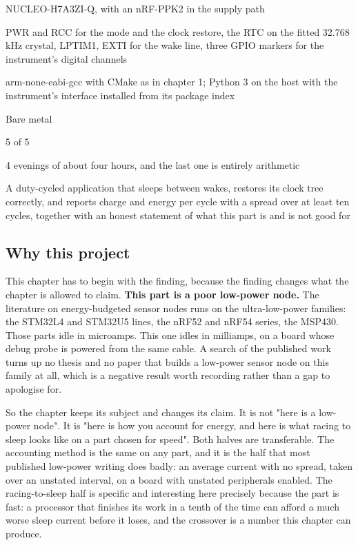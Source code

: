 
\begin{keyfacts}
\item[Board] NUCLEO-H7A3ZI-Q, with an nRF-PPK2 in the supply path
\item[Peripherals] PWR and RCC for the mode and the clock restore, the RTC on the fitted 32.768 kHz crystal, LPTIM1, EXTI for the wake line, three GPIO markers for the instrument's digital channels
\item[Toolchain] arm-none-eabi-gcc with CMake as in chapter 1; Python 3 on the host with the instrument's interface installed from its package index
\item[Operating system] Bare metal
\item[Difficulty] 5 of 5
\item[Effort] 4 evenings of about four hours, and the last one is entirely arithmetic
\item[Deliverable] A duty-cycled application that sleeps between wakes, restores its clock tree correctly, and reports charge and energy per cycle with a spread over at least ten cycles, together with an honest statement of what this part is and is not good for
\end{keyfacts}

\subsection*{Why this project}

This chapter has to begin with the finding, because the finding changes what
the chapter is allowed to claim. \textbf{This part is a poor low-power node.}
The literature on energy-budgeted sensor nodes runs on the ultra-low-power
families: the STM32L4 and STM32U5 lines, the nRF52 and nRF54 series, the
MSP430. Those parts idle in microamps. This one idles in milliamps, on a board
whose debug probe is powered from the same cable. A search of the published
work turns up no thesis and no paper that builds a low-power sensor node on this
family at all, which is a negative result worth recording rather than a gap to
apologise for.

So the chapter keeps its subject and changes its claim. It is not "here is a
low-power node". It is "here is how you account for energy, and here is what
racing to sleep looks like on a part chosen for speed". Both halves are
transferable. The accounting method is the same on any part, and it is the half
that most published low-power writing does badly: an average current with no
spread, taken over an unstated interval, on a board with unstated peripherals
enabled. The racing-to-sleep half is specific and interesting here precisely
because the part is fast: a processor that finishes its work in a tenth of the
time can afford a much worse sleep current before it loses, and the crossover is
a number this chapter can produce.

